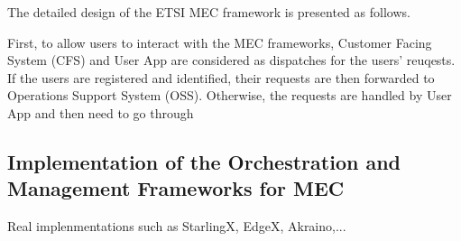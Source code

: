 The detailed design of the ETSI MEC framework is presented as follows.

First, to allow users to interact with the MEC frameworks, Customer Facing System (CFS) and User App are considered as dispatches for the users' reuqests. If the users are registered and identified, their requests are then forwarded to Operations Support System (OSS). Otherwise, the requests are handled by User App and then need to go through 

\subsection{Implementation of the Orchestration and Management Frameworks for MEC}

Real implenmentations such as StarlingX, EdgeX, Akraino,... 
